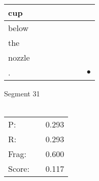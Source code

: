 \documentclass[landscape]{article}
\newcommand{\ssp}{\hspace{2pt}}
\newcommand{\mex}{\cellcolor{g}$\bullet$}
\begin{document}
\begin{tabular}{|l|p{10pt}|p{10pt}|p{10pt}|p{10pt}|p{10pt}|p{10pt}|p{10pt}|}
\hline
\ssp cup \ssp&\hspace{2pt}&\hspace{2pt}&\hspace{2pt}&\hspace{2pt}&\hspace{2pt}&\hspace{2pt}&\hspace{2pt}\\
\hline
\ssp below \ssp&\hspace{2pt}&\hspace{2pt}&\hspace{2pt}&\hspace{2pt}&\hspace{2pt}&\hspace{2pt}&\hspace{2pt}\\
\hline
\ssp the \ssp&\hspace{2pt}&\hspace{2pt}&\hspace{2pt}&\hspace{2pt}&\hspace{2pt}&\hspace{2pt}&\hspace{2pt}\\
\hline
\ssp nozzle \ssp&\hspace{2pt}&\hspace{2pt}&\hspace{2pt}&\hspace{2pt}&\hspace{2pt}&\hspace{2pt}&\hspace{2pt}\\
\hline
\ssp \cellcolor{ref6}. \ssp&\hspace{2pt}&\hspace{2pt}&\hspace{2pt}&\hspace{2pt}&\hspace{2pt}&\hspace{2pt}&\hspace{2pt}\mex\\
\hline
\end{tabular}

\vspace{6pt}
\noindent Segment 31\\\\
\noindent\begin{tabular}{lm{12pt}r}
\hline
P:&&0.293\\
R:&&0.293\\
Frag:&&0.600\\
Score:&&0.117\\
\end{tabular}
\end{document}

